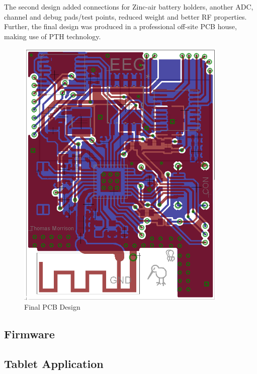 \documentclass[]{article}
\begin{document}
The second design added connections for Zinc-air battery holders, another \ac{ADC}, channel and debug pads/test points, reduced weight and better RF properties. Further, the final design was produced in a professional off-site \ac{PCB} house, making use of \ac{PTH} technology.

\begin{figure}[htb]
	\begin{center}
		\includegraphics[width = 0.9\textwidth]{boardfinal}
	\end{center}
	\caption{Final PCB Design}
	\label{fig:boardfinal}
\end{figure}


\subsection{Firmware}




\subsection{Tablet Application}
\end{document}
